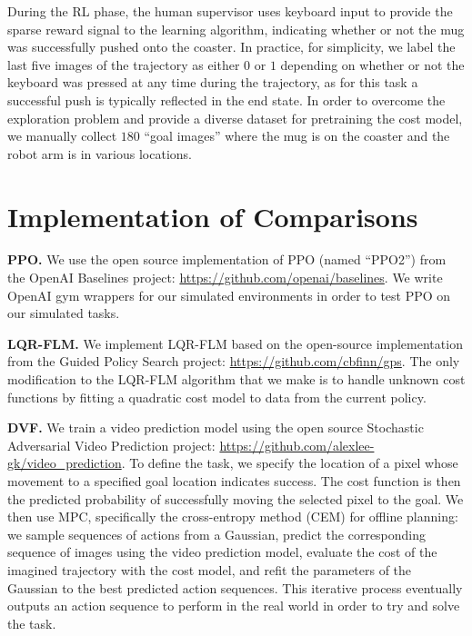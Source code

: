 During the RL phase, the human supervisor uses keyboard input to provide the sparse reward signal to the learning algorithm, indicating whether or not the mug was successfully pushed onto the coaster. In practice, for simplicity, we label the last five images of the trajectory as either $0$ or $1$ depending on whether or not the keyboard was pressed at any time during the trajectory, as for this task a successful push is typically reflected in the end state. In order to overcome the exploration problem and provide a diverse dataset for pretraining the cost model, we manually collect $180$ ``goal images'' where the mug is on the coaster and the robot arm is in various locations.


\section{Implementation of Comparisons}
\label{sec:comp}

{\bf PPO.} We use the open source implementation of PPO (named ``PPO2'') from the OpenAI Baselines project: \mbox{\footnotesize{\url{https://github.com/openai/baselines}}}. We write OpenAI gym wrappers for our simulated environments in order to test PPO on our simulated tasks.

{\bf LQR-FLM.} We implement LQR-FLM based on the open-source implementation from the Guided Policy Search project: \mbox{\footnotesize{\url{https://github.com/cbfinn/gps}}}. The only modification to the LQR-FLM algorithm that we make is to handle unknown cost functions by fitting a quadratic cost model to data from the current policy.

{\bf DVF.} We train a video prediction model using the open source Stochastic Adversarial Video Prediction project: \mbox{\footnotesize{\url{https://github.com/alexlee-gk/video_prediction}}}. To define the task, we specify the location of a pixel whose movement to a specified goal location indicates success. The cost function is then the predicted probability of successfully moving the selected pixel to the goal. We then use MPC, specifically the cross-entropy method (CEM) for offline planning: we sample sequences of actions from a Gaussian, predict the corresponding sequence of images using the video prediction model, evaluate the cost of the imagined trajectory with the cost model, and refit the parameters of the Gaussian to the best predicted action sequences. This iterative process eventually outputs an action sequence to perform in the real world in order to try and solve the task.

